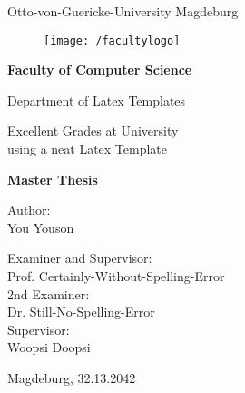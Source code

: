 \documentclass[thesis.tex]{subfiles}
\begin{document}
\thispagestyle {empty}

\begin{center}
\begin{Large}
Otto-von-Guericke-University Magdeburg\\

\begin{figure}
	\centering
	\texttt{[image: /facultylogo]}
	\label{fig:logoinffak}
\end{figure}

\vspace{3mm}

\textbf{Faculty of Computer Science}\\
\end{Large}

\vspace{3mm}

Department of Latex Templates\\

\vspace{1cm}
\begin{Huge}
Excellent Grades at University\\using a neat Latex Template\\
\end{Huge}
\vspace{15mm}
{\Huge \textbf{Master Thesis}}\\
\vspace{15mm}

Author:\\
\vspace{4mm}
{\huge You Youson}\\

\vspace{16mm}

Examiner and Supervisor:\\
\vspace{2mm}
{\Large Prof. Certainly-Without-Spelling-Error}\\
\vspace{4mm}
2nd Examiner:\\
\vspace{2mm}
{\Large Dr. Still-No-Spelling-Error}\\
\vspace{10mm}
Supervisor:\\
\vspace{2mm}
{\large Woopsi Doopsi}\\


\vspace{25mm}

{\large Magdeburg, 32.13.2042}\\

\vspace{40mm}

\end{center}
\clearpage
\end{document}
